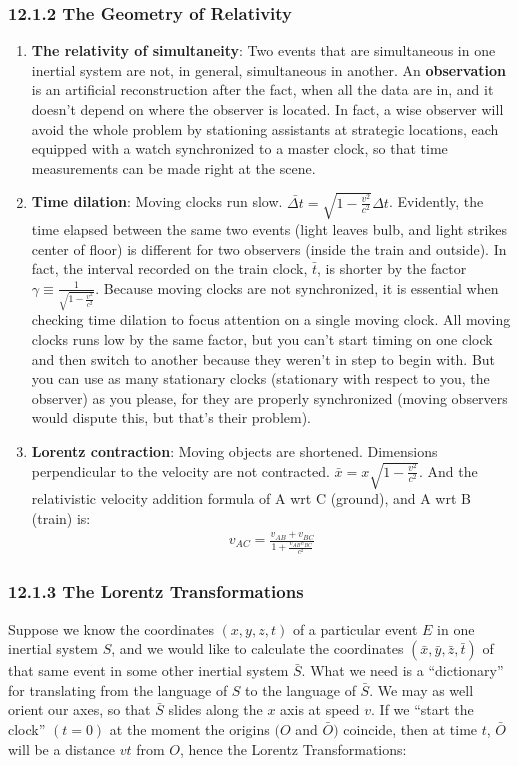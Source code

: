 \documentclass[12pt]{book}
\begin{document}
\subsubsection{12.1.2 The Geometry of Relativity}
    \begin{enumerate}
        \item \textbf{The relativity of simultaneity}: Two events that are simultaneous in one inertial system are not, in general, simultaneous in another. An \textbf{observation} is an artificial reconstruction after the fact, when all the data are in, and it doesn’t depend on where the observer is located. In fact, a wise observer will avoid the whole problem by stationing assistants at strategic locations, each equipped with a watch synchronized to a master clock, so that time measurements can be made right at the scene.
        \item \textbf{Time dilation}: Moving clocks run slow. $\bar{\Delta t} = \sqrt{1 - \frac{v^2}{c^2}}\Delta t$. Evidently, the time elapsed between the same two events (light leaves bulb, and light strikes center of floor) is different for two observers (inside the train and outside). In fact, the interval recorded on the train clock, $\bar{t}$, is shorter by the factor $\gamma \equiv \frac{1}{\sqrt{1 - \frac{v^2}{c^2}}}$. 
        Because moving clocks are not synchronized, it is essential when checking time dilation to focus attention on a single moving clock. All moving clocks runs low by the same factor, but you can’t start timing on one clock and then switch to another because they weren’t in step to begin with. But you can use as many stationary clocks (stationary with respect to you, the observer) as you please, for
        they are properly synchronized (moving observers would dispute this, but that’s their problem).
        \item \textbf{Lorentz contraction}: Moving objects are shortened. Dimensions perpendicular to the velocity are not contracted. $\bar{x} = x \sqrt{1 - \frac{v^2}{c^2}}$. And the relativistic velocity addition formula of A wrt C (ground), and A wrt B (train) is:
        \begin{align}
        v_{AC} = \frac{v_{AB} + v_{BC}}{1 + \frac{v_{AB} v_{BC}}{c^2}}
        \end{align}
    \end{enumerate}
    
\subsubsection{12.1.3 The Lorentz Transformations}
    Suppose we know the coordinates $(x, y, z, t)$ of a particular event $E$ in one inertial system $S$, and we would like to calculate the coordinates $(\bar{x}, \bar{y}, \bar{z}, \bar{t})$ of that same event in some other inertial system $\bar{S}$. What we need is a “dictionary” for translating from the language of $S$ to the language of $\bar{S}$. We may as well orient our axes, so that $\bar{S}$ slides along the $x$ axis at speed $v$. If we “start the clock” $(t = 0)$ at the moment the origins $(O $ and $ \bar{O})$ coincide, then at time $t$, $\bar{O}$ will be a distance $vt$ from $O$, hence the Lorentz Transformations:
    
\end{document}

